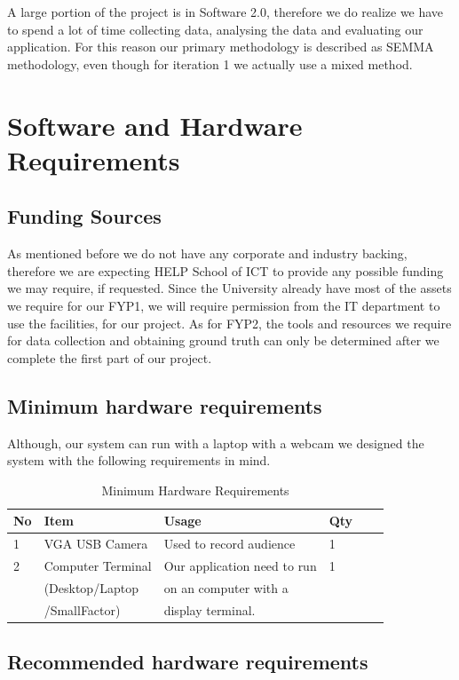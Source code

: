 \documentclass[12pt,a4paper,man]{report}
\begin{document}
A large portion of the project is in Software 2.0, therefore we do realize we have to spend a lot of time collecting data, analysing the data and evaluating our application. For this reason our primary methodology is described as SEMMA methodology, even though for iteration 1 we actually use a mixed method.


\chapter{Software and Hardware Requirements}
\label{sec:org5c0642a}

\section{Funding Sources}
\label{sec:orgfdc1ea0}
As mentioned before we do not have any corporate and industry backing, therefore we are expecting HELP School of ICT to provide any possible funding we may require, if requested. Since the University already have most of the assets we require for our FYP1, we will require permission from the IT department to use the facilities, for our project.
As for FYP2, the tools and resources we require for data collection and obtaining ground truth can only be determined after we complete the first part of our project.

\section{Minimum hardware requirements}
\label{sec:org7d5b19b}
Although, our system can run with a laptop with a webcam we designed the system with the following requirements in mind.

\begin{table}[htbp]
\caption{\label{table:mreq}
Minimum Hardware Requirements}
\centering
\begin{tabular}{|l|l|l|l|lp{3cm}|}
\hline
No & Item & Usage & Qty\\
\hline
1 & VGA USB Camera & Used to record audience & 1\\
\hline
2 & Computer Terminal & Our application need to run & 1\\
 & (Desktop/Laptop & on an computer with a & \\
 & /SmallFactor) & display terminal. & \\
\hline
\end{tabular}
\end{table}

\section{Recommended hardware requirements}
\label{sec:org9dbc68f}
\end{document}
